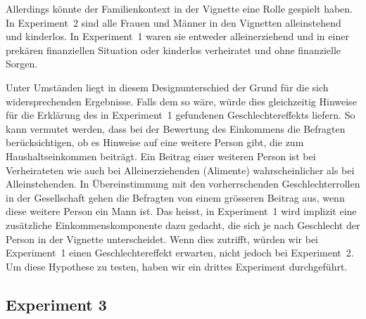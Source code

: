 \documentclass[a4paper,12pt]{article}
\renewcommand{\baselinestretch}{1.1}
\newif\ifcomments
\newcommand{\comment}[1]{%
    \ifcomments\marginpar{\renewcommand{\baselinestretch}{1}\tiny\hspace*{-1.1em}\colorbox{gray!20}%
    {\textcolor{red}{\parbox[t]{.9in}{\raggedright #1}}}}\fi}
\begin{document}
Allerdings könnte der Familienkontext in der Vignette eine Rolle gespielt
haben. In Experiment~2 sind alle Frauen und Männer in den Vignetten
alleinstehend und kinderlos. In Experiment~1 waren sie entweder alleinerziehend
und in einer prekären finanziellen Situation oder kinderlos verheiratet und
ohne finanzielle Sorgen.
\comment{Das Resultat könnte aber auch
    ein Artefakt sein aufgrund der Fragebogenkonstruktion: Bei Exp. 1 sollen die
    Leute in der Frage vor der Vignette angeben, was lohnrelevant sein soll. Zur
    Auswahl stehen Verdienst- und Bedürftigkeitskriterien. Bei Exp. 2 geht es in
    den beiden Fragen vor der Vignette zuerst um die Rechtfertigung von
    Managerlöhnen, im Vgl. zu denen Journi, Schreiner und Krankenschwester
    natürlich alle wenig verdienen und dann wird nach dem angenommenen
    Durchschnittseinkommen gefragt, was die Leute im Mittel auf 8'500.- schätzen,
    also auch viel höher als alle Vignetten. Dass sich deshalb die
    Geschlechterunterschiede aufheben ist jedoch längst nicht zwingend (v.a. weil
    die Bewertung insgesamt nur als leicht und nicht viel zu tief ausfällt).}

Unter Umständen liegt in diesem Designunterschied der Grund für die sich
widersprechenden Ergebnisse. Falls dem so wäre, würde dies gleichzeitig
Hinweise für die Erklärung des in Experiment~1 gefundenen Geschlechtereffekts
liefern. So kann vermutet werden, dass bei der Bewertung des Einkommens die
Befragten berücksichtigen, ob es Hinweise auf eine weitere Person gibt, die zum
Haushaltseinkommen beiträgt. Ein Beitrag einer weiteren Person ist bei
Verheirateten wie auch bei Alleinerziehenden (Alimente) wahrscheinlicher als
bei Alleinstehenden. In Übereinstimmung mit den vorherrschenden
Geschlechterrollen in der Gesellschaft gehen die Befragten von einem grösseren
Beitrag aus, wenn diese weitere Person ein Mann ist. Das heisst, in Experiment~1 
wird implizit eine zusätzliche Einkommenskomponente dazu gedacht, die sich je
nach Geschlecht der Person in der Vignette unterscheidet. Wenn dies zutrifft,
würden wir bei Experiment~1 einen Geschlechtereffekt erwarten, nicht jedoch bei
Experiment~2. Um diese Hypothese zu testen, haben wir ein drittes Experiment
durchgeführt.
\comment{copy-paste aus deinen PPT von Luzern 2014}
\comment{Wobei heutzutage bekommt man kaum mehr Alimente (aber das wissen die
    Leute vielleicht nicht – wusste ich jedenfalls nicht, bis ich da im
    Scheidungsprojekt mit Dorian gearbeitet habe)}


\subsection{Experiment 3}
\comment{Teile der Beschreibung der Daten könnten in den Abschnitt „Daten und Methode“}
\comment{„Offizielle“ Version der Umweltsurveys verwenden -> angepasst}
\end{document}

